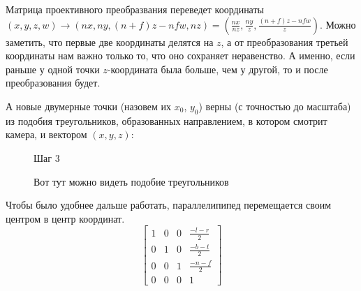 \documentclass{article}
\begin{document}
Матрица проективного преобразвания переведет координаты $(x, y, z, w) \to (nx, ny, (n + f)z - nfw, nz) = (\frac{nx}{nz}, \frac{ny}{z}, \frac{(n + f)z - nfw}{z})$. Можно заметить, что первые две координаты делятся на $z$, а от преобразования третьей координаты нам важно только то, что оно сохраняет неравенство. А именно, если раньше у одной точки $z$-координата была больше, чем у другой, то и после преобразования будет.

А новые двумерные точки (назовем их $x_0$, $y_0$) верны (с точностью до масштаба) из подобия треугольников, образованных направлением, в котором смотрит камера, и вектором $(x, y, z)$:


\begin{center}
\begin{figure}[H]
\caption{Шаг 3}
\label{ris:image}
\end{figure}
\end{center}

\begin{center}
\begin{figure}[H]
\caption{Вот тут можно видеть подобие треугольников}
\label{ris:image}
\end{figure}
\end{center}


Чтобы было удобнее дальше работать, параллелипипед перемещается своим центром в центр координат.
$$
\begin{bmatrix}
  1 & 0 & 0 & \frac{-l - r}{2} \\ 
  0 & 1 & 0 & \frac{-b - t}{2} \\
  0 & 0 & 1 & \frac{-n - f}{2} \\
  0 & 0 & 0 & 1\end{bmatrix}
$$
\end{document}
